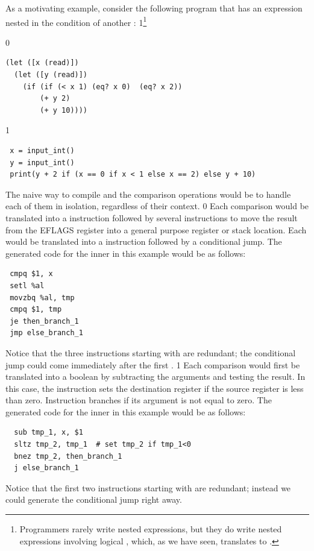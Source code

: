 \documentclass[7x10]{TimesAPriori_MIT}%
\def\racketEd{0}
\def\pythonEd{1}
\def\edition{1}
\def\xeightysixEd{0}
\def\riscvEd{1}
\def\architecture{1}
\newcommand{\pythonColor}[0]{}
\newcommand{\python}[1]{{\if\edition\pythonEd\pythonColor #1\fi}}
\numberwithin{theorem}{chapter}
\numberwithin{definition}{chapter}
\numberwithin{equation}{chapter}
\begin{document}
As a motivating example, consider the following program that has an
 expression nested in the condition of another :%
\python{\footnote{Programmers rarely write nested 
    expressions, but they do write nested expressions involving
    logical \code{and}, which, as we have seen, translates to
    \code{if}.}}
\begin{center}
\begin{minipage}{0.96\textwidth}
{\if\edition\racketEd        
\begin{lstlisting}
(let ([x (read)])
  (let ([y (read)])
    (if (if (< x 1) (eq? x 0)  (eq? x 2))
        (+ y 2)
        (+ y 10))))
\end{lstlisting}
\fi}
{\if\edition\pythonEd\pythonColor
\begin{lstlisting}
 x = input_int()
 y = input_int()
 print(y + 2 if (x == 0 if x < 1 else x == 2) else y + 10)
\end{lstlisting}
\fi}
\end{minipage}
\end{center}
%
The naive way to compile  and the comparison operations would
be to handle each of them in isolation, regardless of their context.
\if\architecture\xeightysixEd
Each comparison would be translated into a  instruction
followed by several instructions to move the result from the EFLAGS
register into a general purpose register or stack location. Each
 would be translated into a  instruction followed by
a conditional jump. The generated code for the inner  in this
example would be as follows:
\begin{center}
\begin{minipage}{0.96\textwidth}
\begin{lstlisting}
 cmpq $1, x
 setl %al
 movzbq %al, tmp
 cmpq $1, tmp
 je then_branch_1
 jmp else_branch_1
\end{lstlisting}
\end{minipage}
\end{center}
Notice that the three instructions starting with  are
redundant; the conditional jump could come immediately after the first
. 
\fi
\if\architecture\riscvEd
Each comparison would first be translated into a boolean by
subtracting the arguments and testing the result.
In this case, the instruction  sets the destination register
if the source register is less than zero. Instruction 
branches if its argument is not equal to zero.
The generated code for the inner  in this
example would be as follows:
\begin{center}
\begin{minipage}{0.96\textwidth}
\begin{lstlisting}
  sub tmp_1, x, $1
  sltz tmp_2, tmp_1  # set tmp_2 if tmp_1<0
  bnez tmp_2, then_branch_1
  j else_branch_1
\end{lstlisting}
\end{minipage}
\end{center}
Notice that the first two instructions starting with  are
redundant; instead we could generate the conditional jump right away.
\fi
\end{document}
